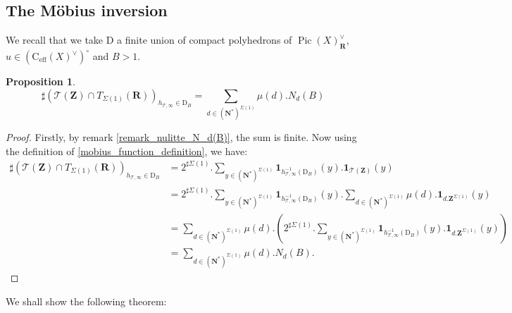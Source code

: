 \documentclass{proc-l}
\newcommand{\R}{\mathbf{R}}
\newcommand{\Z}{\mathbf{Z}}
\newcommand{\N}{\mathbf{N}}
\newcommand{\cone}{\text{C}_{\text{eff}}(X)}
\DeclareMathOperator{\Pic}{Pic}
\newcommand{\stackT}{\mathcal{T}}
\newcommand{\w}{\omega}
\newtheorem{cor}[theorem]{Corollary}
\newtheorem{prop}[theorem]{Proposition}
\theoremstyle{definition}
\theoremstyle{remark}
\numberwithin{equation}{section}
\begin{document}



\subsection{The Möbius inversion}

We recall that we take $\mathrm{D}$ a finite union of compact polyhedrons of $\Pic(X)^{\vee}_{\R}$, $u \in (\cone^{\vee})^{\circ}$ and $B > 1$.

\begin{prop}
    $$ \sharp( \stackT(\Z) \cap T_{\Sigma(1)}(\R) )_{h_{\stackT,\infty} \in \mathrm{D}_B} = \sum\limits_{d \in (\N^*)^{\Sigma(1)}} \mu(d) . N_d(B)  $$
\end{prop}

\begin{proof}
    Firstly, by remark \ref{remark_nulitte_N_d(B)}, the sum is finite. Now using the definition of \ref{mobius_function_definition}, we have:
    \begin{align*}
        \sharp( \stackT(\Z) \cap T_{\Sigma(1)}(\R) )_{h_{\stackT,\infty} \in \mathrm{D}_B} &= 2^{\sharp \Sigma(1)}. \sum\limits_{y \in (\N^*)^{\Sigma(1)}} \mathbf{1}_{h_{\stackT,\infty}^{-1}(\mathrm{D}_B)}(y) . \mathbf{1}_{\stackT(\Z)}(y) \\
        &= 2^{\sharp \Sigma(1)}. \sum\limits_{y \in (\N^*)^{\Sigma(1)}} \mathbf{1}_{h_{\stackT,\infty}^{-1}(\mathrm{D}_B)}(y) . \sum\limits_{d \in (\N^*)^{\Sigma(1)}} \mu(d) . \mathbf{1}_{d.\Z^{\Sigma(1)}}(y) \\
        &= \sum\limits_{d \in (\N^*)^{\Sigma(1)}} \mu(d) . \left( 2^{\sharp \Sigma(1)}. \sum\limits_{y \in (\N^*)^{\Sigma(1)}} \mathbf{1}_{h_{\stackT,\infty}^{-1}(\mathrm{D}_B)}(y) . \mathbf{1}_{d.\Z^{\Sigma(1)}}(y) \right) \\
        &= \sum\limits_{d \in (\N^*)^{\Sigma(1)}} \mu(d) . N_d(B) .
    \end{align*}
\end{proof}

We shall show the following theorem:
\end{document}
